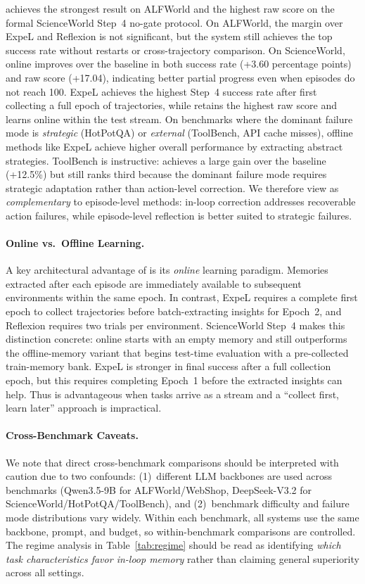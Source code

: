 \method{} achieves the strongest result on ALFWorld and the highest raw score on the formal ScienceWorld Step~4 no-gate protocol. On ALFWorld, the margin over ExpeL and Reflexion is not significant, but the system still achieves the top success rate without restarts or cross-trajectory comparison. On ScienceWorld, online \method{} improves over the baseline in both success rate (+3.60 percentage points) and raw score (+17.04), indicating better partial progress even when episodes do not reach 100. ExpeL achieves the highest Step~4 success rate after first collecting a full epoch of trajectories, while \method{} retains the highest raw score and learns online within the test stream. On benchmarks where the dominant failure mode is \emph{strategic} (HotPotQA) or \emph{external} (ToolBench, API cache misses), offline methods like ExpeL achieve higher overall performance by extracting abstract strategies. ToolBench is instructive: \method{} achieves a large gain over the baseline (+12.5\%) but still ranks third because the dominant failure mode requires strategic adaptation rather than action-level correction. We therefore view \method{} as \emph{complementary} to episode-level methods: in-loop correction addresses recoverable action failures, while episode-level reflection is better suited to strategic failures.

\paragraph{Online vs.\ Offline Learning.} A key architectural advantage of \method{} is its \emph{online} learning paradigm. Memories extracted after each episode are immediately available to subsequent environments within the same epoch. In contrast, ExpeL requires a complete first epoch to collect trajectories before batch-extracting insights for Epoch~2, and Reflexion requires two trials per environment. ScienceWorld Step~4 makes this distinction concrete: online \method{} starts with an empty memory and still outperforms the offline-memory variant that begins test-time evaluation with a pre-collected train-memory bank. ExpeL is stronger in final success after a full collection epoch, but this requires completing Epoch~1 before the extracted insights can help. Thus \method{} is advantageous when tasks arrive as a stream and a ``collect first, learn later'' approach is impractical.

\paragraph{Cross-Benchmark Caveats.} We note that direct cross-benchmark comparisons should be interpreted with caution due to two confounds: (1)~different LLM backbones are used across benchmarks (Qwen3.5-9B for ALFWorld/WebShop, DeepSeek-V3.2 for ScienceWorld/HotPotQA/ToolBench), and (2)~benchmark difficulty and failure mode distributions vary widely. Within each benchmark, all systems use the same backbone, prompt, and budget, so within-benchmark comparisons are controlled. The regime analysis in Table~\ref{tab:regime} should be read as identifying \emph{which task characteristics favor in-loop memory} rather than claiming general superiority across all settings.

